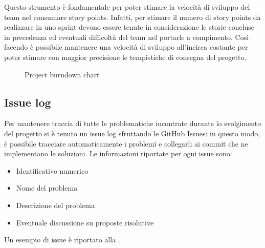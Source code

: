Questo strumento è fondamentale per poter stimare la velocità di sviluppo del team nel consumare story points. Infatti, per stimare il numero di story points da realizzare in uno sprint devono essere tenute in considerazione le storie concluse in precedenza ed eventuali difficoltà del team nel portarle a compimento.
Così facendo è possibile mantenere una velocità di sviluppo all'incirca costante per poter stimare con maggior precisione le tempistiche di consegna del progetto.

\begin{figure}[htp]
  \centering
  \caption{Project burndown chart}
  \label{fig:project-burndown-chart}
\end{figure}

\subsection{Issue log}
Per mantenere traccia di tutte le problematiche incontrate durante lo svolgimento del progetto si è tenuto un issue log sfruttando le GitHub Issues: in questo modo, è possibile tracciare automaticamente i problemi e collegarli ai commit che ne implementano le soluzioni.
Le informazioni riportate per ogni issue sono:
\begin{itemize}
  \item Identificativo numerico
  \item Nome del problema
  \item Descrizione del problema
  \item Eventuale discussione su proposte risolutive
\end{itemize}
Un esempio di issue è riportato alla .

